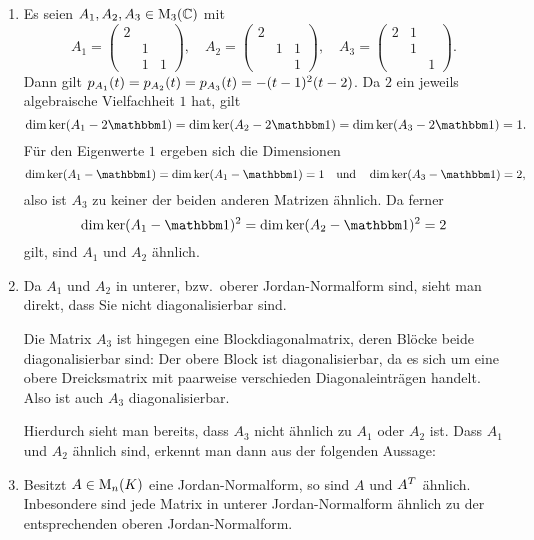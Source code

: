 \begin{example}
  \leavevmode
  \begin{enumerate}
    \item
      Es seien $A_1, A_2, A_3 \in \operatorname{M}_{3}(\mathbb{C})$ mit
      \[
          A_1
        = \begin{pmatrix}
            2 &   &   \\
              & 1 &   \\
              & 1 & 1
          \end{pmatrix},
        \quad
          A_2
        = \begin{pmatrix}
            2 &   &   \\
              & 1 & 1 \\
              &   & 1
          \end{pmatrix},
        \quad
          A_3
        = \begin{pmatrix}
            2 & 1 &   \\
              & 1 &   \\
              &   & 1
          \end{pmatrix}.
      \]
      Dann gilt $p_{A_1}(t) = p_{A_2}(t) = p_{A_3}(t) = - (t-1)^2 (t-2)$.
      Da $2$ ein jeweils algebraische Vielfachheit $1$ hat, gilt
      \[
          \dim \ker (A_1 - 2 \Id)
        = \dim \ker (A_2 - 2 \Id)
        = \dim \ker (A_3 - 2 \Id)
        = 1.
      \]
      Für den Eigenwerte $1$ ergeben sich die Dimensionen
      \[
          \dim \ker (A_1 - \Id)
        = \dim \ker (A_1 - \Id)
        = 1
        \quad\text{und}\quad
          \dim \ker (A_3 - \Id)
       = 2,
      \]
      also ist $A_3$ zu keiner der beiden anderen Matrizen ähnlich.
      Da ferner
      \[
          \dim \ker (A_1 - \Id)^2
        = \dim \ker (A_2 - \Id)^2
        = 2
      \]
      gilt, sind $A_1$ und $A_2$ ähnlich.
      
    \item
      Da $A_1$ und $A_2$ in unterer, bzw.\ oberer Jordan-Normalform sind, sieht man direkt, dass Sie nicht diagonalisierbar sind.
      
      Die Matrix $A_3$ ist hingegen eine Blockdiagonalmatrix, deren Blöcke beide diagonalisierbar sind:
      Der obere Block ist diagonalisierbar, da es sich um eine obere Dreicksmatrix mit paarweise verschieden Diagonaleinträgen handelt.
      Also ist auch $A_3$ diagonalisierbar.
      
      Hierdurch sieht man bereits, dass $A_3$ nicht ähnlich zu $A_1$ oder $A_2$ ist.
      Dass $A_1$ und $A_2$ ähnlich sind, erkennt man dann aus der folgenden Aussage:
      
    \item
      Besitzt $A \in \operatorname{M}_{n}(K)$ eine Jordan-Normalform, so sind $A$ und $A^T$ ähnlich.
      Inbesondere sind jede Matrix in unterer Jordan-Normalform ähnlich zu der entsprechenden oberen Jordan-Normalform.
  \end{enumerate}
\end{example}





